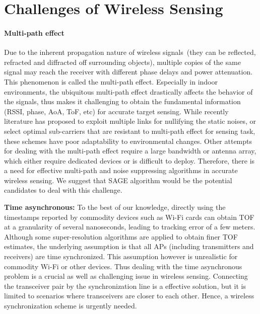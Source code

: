 \section{Challenges of Wireless Sensing}

\paragraph*{Multi-path effect}  Due to the inherent propagation nature of wireless signals~(they can be reflected, refracted and diffracted off
surrounding objects), multiple copies of the same signal may reach the receiver with different phase delays and power attenuation. This
phenomenon is called the multi-path effect. Especially in indoor environments, the ubiquitous multi-path effect drastically affects the
behavior of the signals, thus makes it challenging to obtain the fundamental information (RSSI, phase, AoA, ToF, etc) for accurate target
sensing. While recently literature has proposed to exploit multiple links for nullifying the static noises, or select optimal sub-carriers
that are resistant to multi-path effect for sensing task, these schemes have poor adaptability to environmental changes. Other attempts for
dealing with the multi-path effect require a large bandwidth or antenna array, which either require dedicated devices or is difficult to
deploy. Therefore, there is a need for effective multi-path and noise suppressing algorithms in accurate wireless sensing. We suggest that
SAGE algorithm would be the potential candidates to deal with this challenge.

\textbf{Time asynchronous:} To the best of our knowledge, directly using the timestamps reported by commodity devices such as Wi-Fi cards can obtain TOF at a granularity of several nanoseconds, leading to tracking error of a few meters. Although some super-resolution algorithms are applied to obtain finer TOF estimates, the underlying assumption is that all APs (including transmitters and receivers) are time synchronized. This assumption however is unrealistic for commodity Wi-Fi or other devices. Thus dealing with the time asynchronous problem is a crucial as well as challenging issue in wireless sensing. Connecting the transceiver pair by the synchronization line is a effective solution, but it is limited to scenarios where transceivers are closer to each other. Hence, a wireless synchronization scheme is urgently needed.

